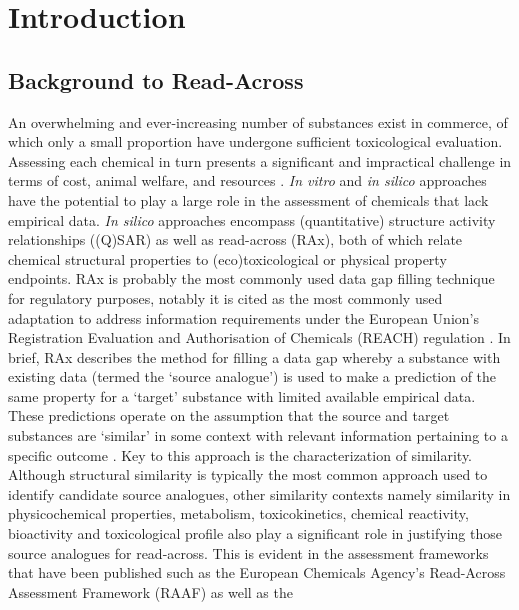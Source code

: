 \documentclass[
  super,
  preprint,
  3p]{elsarticle}
\begin{document}
\section{Introduction}\label{introduction}

\subsection{Background to Read-Across}\label{sec-background}

An overwhelming and ever-increasing number of substances exist in
commerce, of which only a small proportion have undergone sufficient
toxicological evaluation. Assessing each chemical in turn presents a
significant and impractical challenge in terms of cost, animal welfare,
and resources \citep{nrc_toxicity_1984}. \emph{In vitro} and \emph{in
silico} approaches have the potential to play a large role in the
assessment of chemicals that lack empirical data. \emph{In silico}
approaches encompass (quantitative) structure activity relationships
((Q)SAR) as well as read-across (RAx), both of which relate chemical
structural properties to (eco)toxicological or physical property
endpoints. RAx is probably the most commonly used data gap filling
technique for regulatory purposes, notably it is cited as the most
commonly used adaptation to address information requirements under the
European Union's Registration Evaluation and Authorisation of Chemicals
(REACH) regulation \citep{eu_regulation_2006, macmillan_last_2024}. In
brief, RAx describes the method for filling a data gap whereby a
substance with existing data (termed the `source analogue') is used to
make a prediction of the same property for a `target' substance with
limited available empirical data. These predictions operate on the
assumption that the source and target substances are `similar' in some
context with relevant information pertaining to a specific outcome
\citep{enoch_chemical_2010, oecd_guidance_2014}. Key to this approach is
the characterization of similarity. Although structural similarity is
typically the most common approach used to identify candidate source
analogues, other similarity contexts namely similarity in
physicochemical properties, metabolism, toxicokinetics, chemical
reactivity, bioactivity and toxicological profile also play a
significant role in justifying those source analogues for read-across.
This is evident in the assessment frameworks that have been published
such as the European Chemicals Agency's Read-Across Assessment Framework
(RAAF) \citep{european_chemicals_agency_read-across_2017} as well as the
\end{document}
